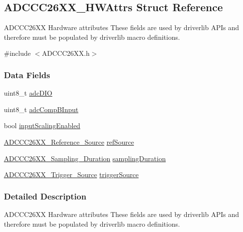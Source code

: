 \subsection{A\+D\+C\+C\+C26\+X\+X\+\_\+\+H\+W\+Attrs Struct Reference}
\label{struct_a_d_c_c_c26_x_x___h_w_attrs}


A\+D\+C\+C\+C26\+X\+X Hardware attributes These fields are used by driverlib A\+P\+Is and therefore must be populated by driverlib macro definitions.  




{\ttfamily \#include $<$A\+D\+C\+C\+C26\+X\+X.\+h$>$}

\subsubsection*{Data Fields}
\begin{DoxyCompactItemize}
\item 
uint8\+\_\+t \hyperlink{struct_a_d_c_c_c26_x_x___h_w_attrs_abaf21f30d8f493f6a8ae728c56f9f500}{adc\+D\+I\+O}
\item 
uint8\+\_\+t \hyperlink{struct_a_d_c_c_c26_x_x___h_w_attrs_a71b2b8a0d611140021e0c4eff2135598}{adc\+Comp\+B\+Input}
\item 
bool \hyperlink{struct_a_d_c_c_c26_x_x___h_w_attrs_a9f4b33496c6c0879809fccfc4914e95a}{input\+Scaling\+Enabled}
\item 
\hyperlink{_a_d_c_c_c26_x_x_8h_a5ed293d16be70036c4008865dbe33b98}{A\+D\+C\+C\+C26\+X\+X\+\_\+\+Reference\+\_\+\+Source} \hyperlink{struct_a_d_c_c_c26_x_x___h_w_attrs_a49aac5c605e70776345e489a270dc45a}{ref\+Source}
\item 
\hyperlink{_a_d_c_c_c26_x_x_8h_adb3cf48cf9cac58a07ade90966bdb8f1}{A\+D\+C\+C\+C26\+X\+X\+\_\+\+Sampling\+\_\+\+Duration} \hyperlink{struct_a_d_c_c_c26_x_x___h_w_attrs_a3a2bdb16efd6a7b9cd8bc32bea0cf3f2}{sampling\+Duration}
\item 
\hyperlink{_a_d_c_c_c26_x_x_8h_ac122319c50b5f443f4d3254a2b2d58f0}{A\+D\+C\+C\+C26\+X\+X\+\_\+\+Trigger\+\_\+\+Source} \hyperlink{struct_a_d_c_c_c26_x_x___h_w_attrs_a0951f527dea50a156570e1a3055db84c}{trigger\+Source}
\end{DoxyCompactItemize}


\subsubsection{Detailed Description}
A\+D\+C\+C\+C26\+X\+X Hardware attributes These fields are used by driverlib A\+P\+Is and therefore must be populated by driverlib macro definitions. 

